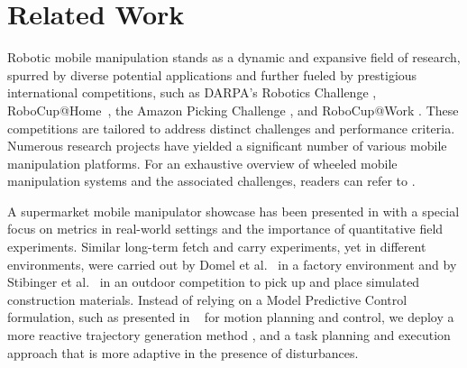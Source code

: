 \section{Related Work}

Robotic mobile manipulation stands as a dynamic and expansive field of research, spurred by diverse potential applications and further fueled by prestigious
international competitions, such as DARPA’s Robotics Challenge
\cite{darpa_challenge}, RoboCup@Home~\cite{robocup_home}, the Amazon Picking
Challenge \cite{corbato2018integrating}, and RoboCup@Work \cite{robocup_work}. These
competitions are tailored to address distinct challenges and performance
criteria. Numerous research projects have yielded a significant number of
various mobile manipulation platforms. For an exhaustive overview of wheeled
mobile manipulation systems and the associated challenges, readers can refer to
\cite{overview1,overview2}. 

A supermarket mobile manipulator showcase has been presented in \cite{toyota2023} with a special focus on metrics in real-world settings and the importance of quantitative field experiments. Similar long-term fetch and carry experiments, yet in different environments, were carried out by Domel et al.~\cite{domel2017toward} in a factory environment and by Stibinger et al.~\cite{vstibinger2021mobile} in an outdoor competition to pick up and place simulated
construction materials. Instead of relying on a  Model Predictive Control formulation, such as presented in ~\cite{minniti2021model} for motion planning and control, we deploy a more reactive trajectory generation method \cite{ratliff2023fabrics}, and a task planning and execution approach that is more adaptive in the presence of disturbances.



